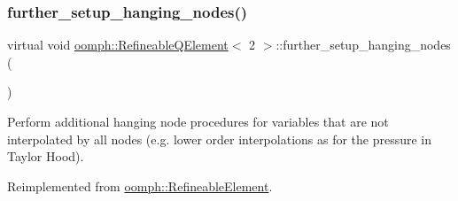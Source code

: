 \subsubsection{\texorpdfstring{further\+\_\+setup\+\_\+hanging\+\_\+nodes()}{further\_setup\_hanging\_nodes()}}
{\footnotesize\ttfamily virtual void \hyperlink{classoomph_1_1RefineableQElement}{oomph\+::\+Refineable\+Q\+Element}$<$ 2 $>$\+::further\+\_\+setup\+\_\+hanging\+\_\+nodes (\begin{DoxyParamCaption}{ }\end{DoxyParamCaption})\hspace{0.3cm}{\ttfamily [pure virtual]}}



Perform additional hanging node procedures for variables that are not interpolated by all nodes (e.\+g. lower order interpolations as for the pressure in Taylor Hood). 



Reimplemented from \hyperlink{classoomph_1_1RefineableElement_a86ea01c485f7ff822dce74b884312ccb}{oomph\+::\+Refineable\+Element}.




